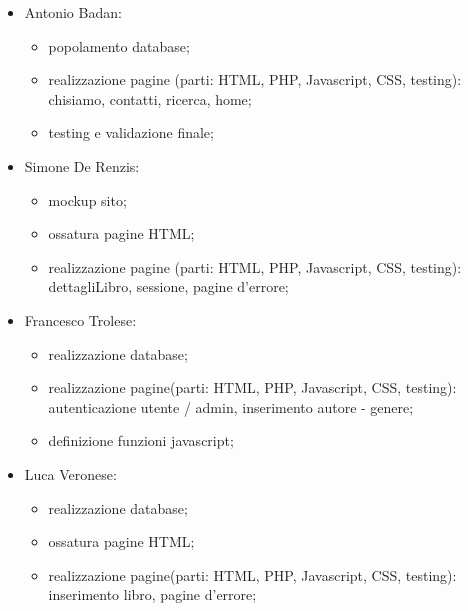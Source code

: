 \documentclass[12pt,a4paper,headings=optiontohead]{article}
\begin{document}
	\begin{itemize}
		\item Antonio Badan: 
		\begin{itemize}
			\item popolamento database;
			\item realizzazione pagine (parti: HTML, PHP, Javascript, CSS, testing): chisiamo, contatti, ricerca, home;
			\item testing e validazione finale;
		\end{itemize}
		
		\item Simone De Renzis: 
		\begin{itemize}
			\item mockup sito;
			\item ossatura pagine HTML;
			\item realizzazione pagine (parti: HTML, PHP, Javascript, CSS, testing): dettagliLibro, sessione, pagine d'errore;
		\end{itemize}
		
		\item Francesco Trolese:
		\begin{itemize}
			\item realizzazione database;
			\item realizzazione pagine(parti: HTML, PHP, Javascript, CSS, testing): autenticazione utente / admin, inserimento autore - genere;
			\item definizione funzioni javascript;
		\end{itemize}
		
		\item Luca Veronese: 
		\begin{itemize}
			\item realizzazione database;
			\item ossatura pagine HTML;
			\item realizzazione pagine(parti: HTML, PHP, Javascript, CSS, testing): inserimento libro, pagine d'errore;
		\end{itemize}
	\end{itemize}
	
	
\end{document}
